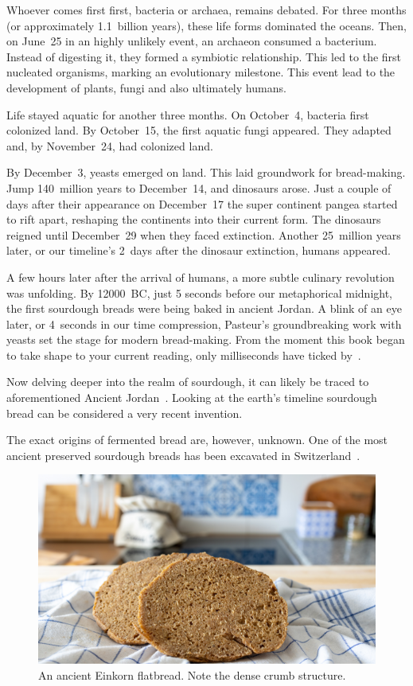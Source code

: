 Whoever comes first first, bacteria or archaea, remains debated. For three
months (or approximately 1.1~billion years), these life forms dominated
the oceans. Then, on June~25 in an highly unlikely event, an archaeon consumed a bacterium.
Instead of digesting it, they formed a symbiotic relationship. This led to the
first nucleated organisms, marking an evolutionary milestone. This event lead
to the development of plants, fungi and also ultimately humans.

Life stayed aquatic for another three months.
On October~4, bacteria first colonized land. By October~15, the
first aquatic fungi appeared. They adapted and, by November~24, had colonized
land.

By December~3, yeasts emerged on land. This laid groundwork for bread-making.
Jump 140~million years to December~14, and dinosaurs arose. Just a couple
of days after their appearance on December~17 the super continent pangea
started to rift apart, reshaping the continents into their current form.
The dinosaurs reigned until December~29 when they faced extinction.
Another 25~million years later, or our timeline's 2~days after the dinosaur
extinction, humans appeared.

A few hours later after the arrival of humans, a more subtle culinary
revolution was unfolding. By  \num{12000}~BC, just 5 seconds before our metaphorical
midnight, the first sourdough breads were being baked in ancient Jordan. A blink of
an eye later, or 4~seconds in our time compression, Pasteur's groundbreaking work
with yeasts set the stage for modern bread-making. From the moment this book
began to take shape to your current reading, only milliseconds have ticked by~\cite{Yong_2017}.

Now delving deeper into the realm of sourdough, it can likely be traced to aforementioned
Ancient Jordan~\cite{jordan+bread}. Looking at the earth's timeline sourdough
bread can be considered a very recent invention.

The exact origins of fermented
bread are, however, unknown. One of the most ancient preserved
sourdough breads has been excavated in Switzerland~\cite{switzerland+bread}.

\begin{figure}[ht]
  \includegraphics[width=\textwidth]{einkorn-crumb}
  \caption[Ancient Einkorn flatbread]{An ancient Einkorn flatbread. Note the
      dense crumb structure.}%
  \label{einkorn-crumb}
\end{figure}


